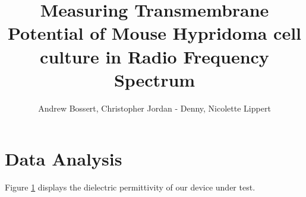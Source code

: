 \documentclass{article}
\title{Measuring Transmembrane Potential of Mouse Hypridoma cell culture in Radio Frequency Spectrum}
\author{Andrew Bossert, Christopher Jordan - Denny, Nicolette Lippert}
\begin{document}
\maketitle

\section{Data Analysis}

Figure \ref{diectric_Permittivity} displays the dielectric permittivity of our device under test.

\begin{figure}[ht]
\label{diectric_Permittivity}

\end{figure}
\end{document}
